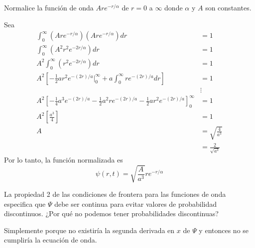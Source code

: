 





\begin{problema}
    Normalice la función de onda $A r e^{-r / \alpha}$ de $r=0$ a $\infty$ donde $\alpha$ y $A$ son constantes.
    \begin{sol}
        Sea
        \begin{align*}
            \int_0^\infty \left(Are^{-r/\alpha}\right)\left(Are^{-r/\alpha}\right) dr &= 1\\
            \int_0^\infty \left(A^2r^2e^{-2r/\alpha}\right)dr &= 1\\
            A^2\int_0^\infty \left(r^2e^{-2r/\alpha}\right)dr &= 1\\
            A^2\left[-\frac{1}{2}ar^2e^{-(2r)/a}\Big|_0^\infty+a\int_0^\infty re^{-(2r)/a}dr\right] &= 1\\
            &\vdots\\
            A^2\left[-\frac{1}{4}a^3e^{-(2r)/a}-\frac{1}{2}a^2re^{-(2r)/a}-\frac{1}{2}ar^2e^{-(2r)/a}\right]_0^\infty &= 1\\
            A^2\left[\frac{a^3}{4}\right] &= 1\\
            A &= \sqrt{\frac{4}{a^3}}\\
              &= \frac{2}{\sqrt{a^3}}
        \end{align*}
        Por lo tanto, la función normalizada es
        $$\psi(r,t)=\sqrt{\frac{A}{a^3}}re^{-r/\alpha}$$

    \end{sol}
\end{problema}

\begin{problema}
    La propiedad 2 de las condiciones de frontera para las funciones de onda especifica que $\Psi$ debe ser continua para evitar valores de probabilidad discontinuos. ¿Por qué no podemos tener probabilidades discontinuas?
    \begin{sol}
        Simplemente porque no existiría la segunda derivada en $x$ de $\Psi$ y entonces no se cumpliría la ecuación de onda. 
    \end{sol}
\end{problema}

